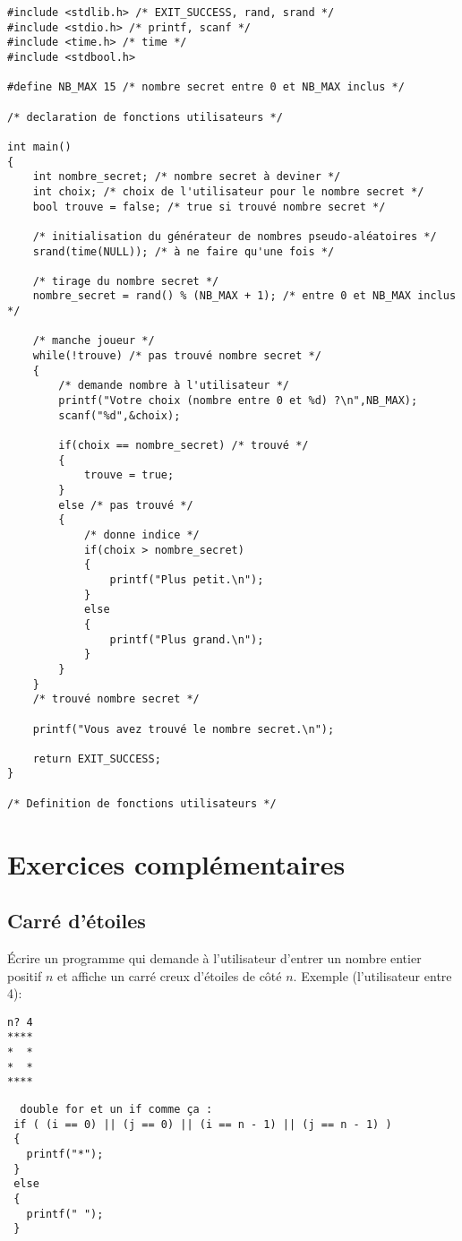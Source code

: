 \begin{correction}
\begin{verbatim}
#include <stdlib.h> /* EXIT_SUCCESS, rand, srand */
#include <stdio.h> /* printf, scanf */
#include <time.h> /* time */
#include <stdbool.h>

#define NB_MAX 15 /* nombre secret entre 0 et NB_MAX inclus */

/* declaration de fonctions utilisateurs */

int main()
{
    int nombre_secret; /* nombre secret à deviner */
    int choix; /* choix de l'utilisateur pour le nombre secret */
    bool trouve = false; /* true si trouvé nombre secret */

    /* initialisation du générateur de nombres pseudo-aléatoires */
    srand(time(NULL)); /* à ne faire qu'une fois */

    /* tirage du nombre secret */
    nombre_secret = rand() % (NB_MAX + 1); /* entre 0 et NB_MAX inclus */

    /* manche joueur */
    while(!trouve) /* pas trouvé nombre secret */
    {
        /* demande nombre à l'utilisateur */
        printf("Votre choix (nombre entre 0 et %d) ?\n",NB_MAX);
        scanf("%d",&choix);

        if(choix == nombre_secret) /* trouvé */
        {
            trouve = true;
        }
        else /* pas trouvé */
        {
            /* donne indice */
            if(choix > nombre_secret)
            {
                printf("Plus petit.\n");
            }
            else
            {
                printf("Plus grand.\n");
            }
        }
    }
    /* trouvé nombre secret */

    printf("Vous avez trouvé le nombre secret.\n");

    return EXIT_SUCCESS;
}

/* Definition de fonctions utilisateurs */
\end{verbatim}
\end{correction}


\section{Exercices complémentaires}

\subsection{Carré d'étoiles}

Écrire un programme qui demande à l'utilisateur d'entrer un nombre
entier positif $n$ et affiche un carré creux d'étoiles de côté $n$.
Exemple (l'utilisateur entre 4):
\begin{verbatim}
n? 4
****
*  *
*  *
****
\end{verbatim}

\begin{correction}
\begin{verbatim}
  double for et un if comme ça :
 if ( (i == 0) || (j == 0) || (i == n - 1) || (j == n - 1) )
 {
   printf("*");
 }
 else
 {
   printf(" ");
 }
\end{verbatim}
\end{correction}





